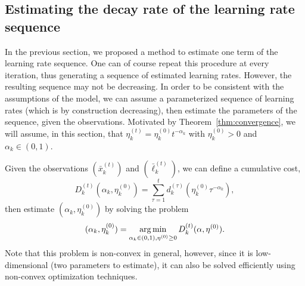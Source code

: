 \documentclass{sig-alternate-ipsn13}
\begin{document}
\subsection{Estimating the decay rate of the learning rate sequence}
In the previous section, we proposed a method to estimate one term of the learning rate sequence. One can of course repeat this procedure at every iteration, thus generating a sequence of estimated learning rates. However, the resulting sequence may not be decreasing. In order to be consistent with the assumptions of the model, we can assume a parameterized sequence of learning rates (which is by construction decreasing), then estimate the parameters of the sequence, given the observations. Motivated by Theorem~\ref{thm:convergence}, we will assume, in this section, that $\eta^{(t)}_k = \eta^{(0)}_k t^{-\alpha_k}$ with $\eta^{(0)}_k > 0$ and $\alpha_k \in (0, 1)$.

Given the observations $(\bar x^{(t)}_k)$ and $(\bar \ell^{(t)}_k)$, we can define a cumulative cost,
\[
D^{(t)}_k(\alpha_k, \eta^{(0)}_k) = \sum_{\tau = 1}^t d_k^{(\tau)}(\eta_k^{(0)} \tau^{-\alpha_k}),
\]
then estimate $(\alpha_k, \eta^{(0)}_k)$ by solving the problem
\begin{equation}
\label{eq:estimation_alpha_eta0}
(\alpha_k, \eta^{(0)}_k) = \operatorname*{arg\,min}_{\alpha_k \in (0, 1), \eta^{(0)} \geq 0} D^{(t)}_k(\alpha, \eta^{(0)}).
\end{equation}
Note that this problem is non-convex in general, however, since it is low-dimensional (two parameters to estimate), it can also be solved efficiently using non-convex optimization techniques.


\end{document}
